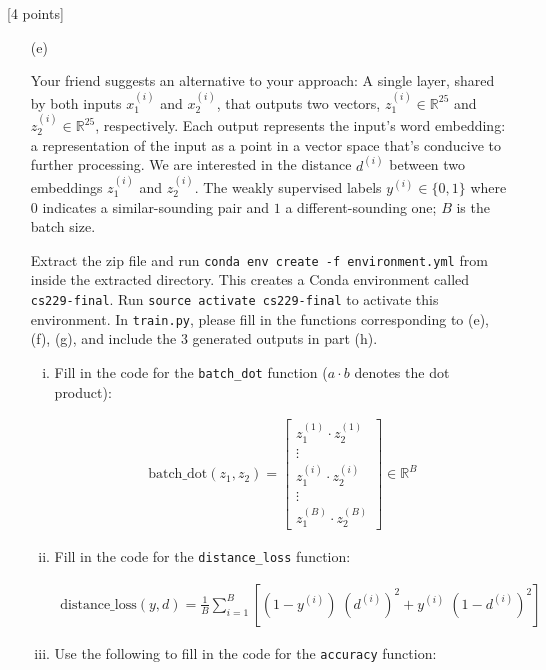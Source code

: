 \documentclass{article}
\begin{document}
\noindent {} [4 points]

\begin{itemize}

    \item [(e)] 

Your friend suggests an alternative to your approach: A single layer, shared by both inputs $x_1^{(i)}$ and $x_2^{(i)}$, that outputs two vectors, $z_1^{(i)} \in \mathbb{R}^{25}$ and $z_2^{(i)} \in \mathbb{R}^{25}$, respectively. Each output represents the input's word embedding: a representation of the input as a point in a vector space that's conducive to further processing. We are interested in the distance $d^{(i)}$ between two embeddings $z_1^{(i)}$ and $z_2^{(i)}$. The weakly supervised labels $y^{(i)} \in \{0, 1\}$ where $0$ indicates a similar-sounding pair and $1$ a different-sounding one; $B$ is the batch size. 

Extract the zip file and run \texttt{conda env create -f environment.yml} from inside the extracted directory. This creates a Conda environment called \texttt{cs229-final}. Run \texttt{source activate cs229-final} to activate this environment. In \texttt{train.py}, please fill in the functions corresponding to (e), (f), (g), and include the 3 generated outputs in part (h). 
    
    \begin{enumerate}[(i)]
    \item Fill in the code for the \texttt{batch\_dot} function ($a \cdot b$ denotes the dot product):
    
    \begin{align}
    \mathrm{batch\_dot}(z_1, z_2) = \begin{bmatrix}
        z_1^{(1)} \cdot z_2^{(1)} \\
        \vdots \\
        z_1^{(i)} \cdot z_2^{(i)} \\
        \vdots \\
        z_1^{(B)} \cdot z_2^{(B)}
    \end{bmatrix} \in \mathbb{R}^{B}
    \end{align}
    \item Fill in the code for the \texttt{distance\_loss} function:
    
    \begin{align}
    \mathrm{distance\_loss}(y, d) = \frac{1}{B} \sum_{i = 1}^{B} \left[ (1 - y^{(i)}) \; (d^{(i)})^2 + y^{(i)} \; (1 - d^{(i)})^2 \right]
    \end{align}
    \item Use the following to fill in the code for the \texttt{accuracy} function:
    

\end{enumerate}
\end{itemize}
\end{document}

